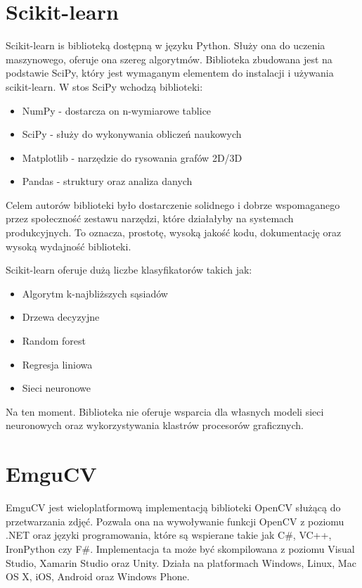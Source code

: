 \documentclass[brudnopis]{xmgr}
\begin{document}
\section{Scikit-learn}

Scikit-learn\cite{17} is biblioteką dostępną w języku Python. Służy ona do uczenia maszynowego, oferuje ona szereg algorytmów. Biblioteka zbudowana jest na podstawie SciPy, który jest wymaganym elementem do instalacji i używania scikit-learn. W stos SciPy wchodzą biblioteki:

\begin{itemize}
\item
NumPy - dostarcza on n-wymiarowe tablice
\item
SciPy - służy do wykonywania obliczeń naukowych
\item
Matplotlib - narzędzie do rysowania grafów 2D/3D
\item
Pandas - struktury oraz analiza danych
\end{itemize}

Celem autorów biblioteki było dostarczenie solidnego i dobrze wspomaganego przez społeczność zestawu narzędzi, które działałyby na systemach produkcyjnych. To oznacza,  prostotę, wysoką jakość kodu, dokumentację oraz wysoką wydajność biblioteki.

Scikit-learn oferuje dużą liczbe klasyfikatorów takich jak:
\begin{itemize}
\item
Algorytm k-najbliższych sąsiadów
\item
Drzewa decyzyjne
\item
Random forest
\item
Regresja liniowa
\item
Sieci neuronowe
\end{itemize}

Na ten moment. Biblioteka nie oferuje wsparcia dla własnych modeli sieci neuronowych oraz wykorzystywania klastrów procesorów graficznych.

\section{EmguCV}

EmguCV\cite{18} jest wieloplatformową implementacją biblioteki OpenCV służącą do przetwarzania zdjęć. Pozwala ona na wywoływanie funkcji OpenCV z poziomu .NET oraz języki programowania, które są wspierane takie jak C\#, VC++, IronPython czy F\#. Implementacja ta może być skompilowana z poziomu Visual Studio, Xamarin Studio oraz Unity. Działa na platformach Windows, Linux, Mac OS X, iOS, Android oraz Windows Phone.
\end{document}
